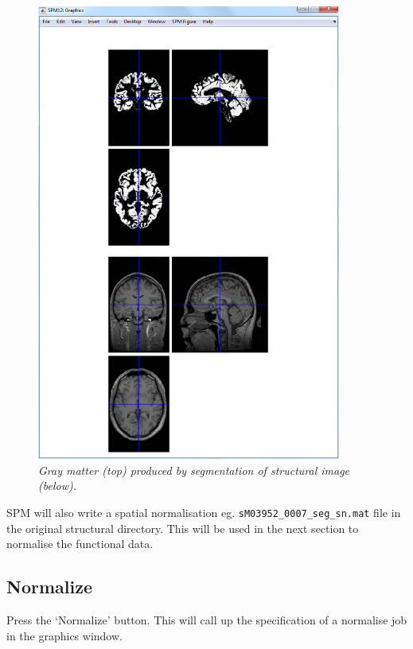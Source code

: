 \begin{figure}
\begin{center}
\includegraphics[width=100mm]{faces/gray}
\caption{\em Gray matter (top) produced by segmentation of structural image (below). \label{face_gray}}
\end{center}
\end{figure}

SPM will also write a spatial normalisation eg. \verb!sM03952_0007_seg_sn.mat! file in the original structural directory. This will be used in the next section to normalise the functional data. 


\subsection{Normalize}

Press the `Normalize' button. This will call up the specification of a normalise job in the graphics window. 

